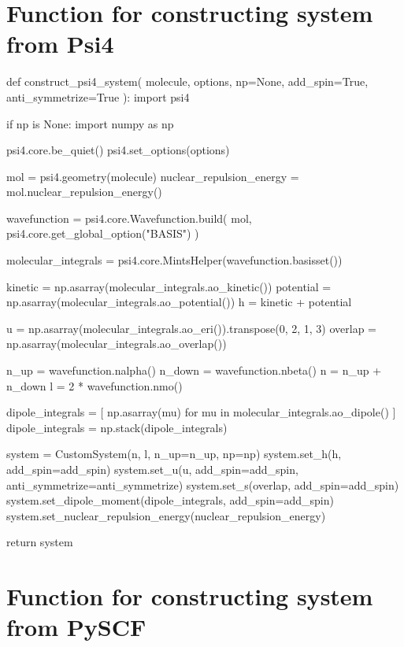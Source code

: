 \section{Function for constructing system from Psi4}
\label{sec:custom_system_psi4}

\begin{python}
def construct_psi4_system(
    molecule, options, np=None, add_spin=True, anti_symmetrize=True
):
    import psi4

    if np is None:
        import numpy as np

    psi4.core.be_quiet()
    psi4.set_options(options)

    mol = psi4.geometry(molecule)
    nuclear_repulsion_energy = mol.nuclear_repulsion_energy()

    wavefunction = psi4.core.Wavefunction.build(
        mol, psi4.core.get_global_option("BASIS")
    )

    molecular_integrals = psi4.core.MintsHelper(wavefunction.basisset())

    kinetic = np.asarray(molecular_integrals.ao_kinetic())
    potential = np.asarray(molecular_integrals.ao_potential())
    h = kinetic + potential

    u = np.asarray(molecular_integrals.ao_eri()).transpose(0, 2, 1, 3)
    overlap = np.asarray(molecular_integrals.ao_overlap())

    n_up = wavefunction.nalpha()
    n_down = wavefunction.nbeta()
    n = n_up + n_down
    l = 2 * wavefunction.nmo()

    dipole_integrals = [
        np.asarray(mu) for mu in molecular_integrals.ao_dipole()
    ]
    dipole_integrals = np.stack(dipole_integrals)

    system = CustomSystem(n, l, n_up=n_up, np=np)
    system.set_h(h, add_spin=add_spin)
    system.set_u(u, add_spin=add_spin, anti_symmetrize=anti_symmetrize)
    system.set_s(overlap, add_spin=add_spin)
    system.set_dipole_moment(dipole_integrals, add_spin=add_spin)
    system.set_nuclear_repulsion_energy(nuclear_repulsion_energy)

    return system
\end{python}

\section{Function for constructing system from PySCF}
\label{sec:custom_system_pyscf}

